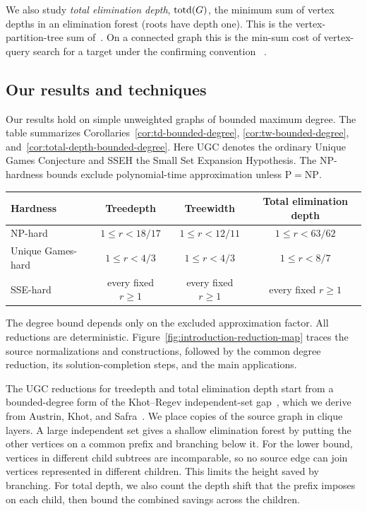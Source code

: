 We also study \emph{total elimination depth}, $\operatorname{totd}(G)$, the minimum
sum of vertex depths in an elimination forest (roots have depth one).
This is the vertex-partition-tree sum of~\cite{HogemoEtAl2021}. On a
connected graph this is the min-sum cost of vertex-query
search for a target under the confirming convention
~\cite{HogemoEtAl2021,Szyfelbein2025GraphSearch}.

\subsection{Our results and techniques}
\label{subsec:results-techniques}

Our results hold on simple unweighted graphs of bounded maximum degree.
The table summarizes Corollaries~\ref{cor:td-bounded-degree},
\ref{cor:tw-bounded-degree}, and~\ref{cor:total-depth-bounded-degree}.
Here UGC denotes the ordinary Unique Games Conjecture and SSEH the Small Set
Expansion Hypothesis. The NP-hardness bounds exclude polynomial-time
approximation unless $\mathrm{P}=\mathrm{NP}$.

\begin{center}
\begin{tabular}{lccc}
\toprule
\textup{Hardness} & \textup{Treedepth} & \textup{Treewidth}
                  & \textup{Total elimination depth}\\
\midrule
\textup{NP-hard} & $1\leq r<18/17$ & $1\leq r<12/11$
                 & $1\leq r<63/62$\\
\textup{Unique Games-hard} & $1\leq r<4/3$ & $1\leq r<4/3$
                           & $1\leq r<8/7$\\
\textup{SSE-hard} & \textup{every fixed }$r\geq1$
                & \textup{every fixed }$r\geq1$
                & \textup{every fixed }$r\geq1$\\
\bottomrule
\end{tabular}
\end{center}
The degree bound depends only on the excluded approximation factor.
All reductions are deterministic.
Figure~\ref{fig:introduction-reduction-map} traces the source normalizations
and constructions, followed by the common degree reduction, its
solution-completion steps, and the main applications.

The UGC reductions for treedepth and total elimination depth start from a
bounded-degree form of the Khot--Regev independent-set gap~\cite{KhotRegev},
which we derive from Austrin, Khot, and Safra~\cite{AKS2011}. We place copies of the
source graph in clique layers. A large independent set gives a shallow
elimination forest by putting the other vertices on a common prefix and
branching below it. For the lower bound, vertices in different child
subtrees are incomparable, so no source edge can join vertices represented
in different children. This limits the height saved by branching. For
total depth, we also count the depth shift that the prefix imposes on each
child, then bound the combined savings across the children.

